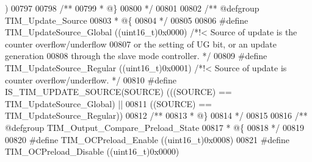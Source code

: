 \begin{DoxyCode}
{      )}
00797 
00798 \textcolor{comment}{/**}
00799 \textcolor{comment}{  * @\}}
00800 \textcolor{comment}{  */}
00801 
00802 \textcolor{comment}{/** @defgroup TIM\_Update\_Source }
00803 \textcolor{comment}{  * @\{}
00804 \textcolor{comment}{  */}
00805 
00806 \textcolor{preprocessor}{#}\textcolor{preprocessor}{define} \textcolor{preprocessor}{TIM\_UpdateSource\_Global}            \textcolor{preprocessor}{(}\textcolor{preprocessor}{(}\textcolor{preprocessor}{uint16\_t}\textcolor{preprocessor}{)}0x0000\textcolor{preprocessor}{)} \textcolor{comment}{/*!< Source of update is the counter
       overflow/underflow}
00807 \textcolor{comment}{                                                                   or the setting of UG bit, or an
       update generation}
00808 \textcolor{comment}{                                                                   through the slave mode controller.
       */}
00809 \textcolor{preprocessor}{#}\textcolor{preprocessor}{define} \textcolor{preprocessor}{TIM\_UpdateSource\_Regular}           \textcolor{preprocessor}{(}\textcolor{preprocessor}{(}\textcolor{preprocessor}{uint16\_t}\textcolor{preprocessor}{)}0x0001\textcolor{preprocessor}{)} \textcolor{comment}{/*!< Source of update is counter
       overflow/underflow. */}
00810 \textcolor{preprocessor}{#}\textcolor{preprocessor}{define} \textcolor{preprocessor}{IS\_TIM\_UPDATE\_SOURCE}\textcolor{preprocessor}{(}\textcolor{preprocessor}{SOURCE}\textcolor{preprocessor}{)} \textcolor{preprocessor}{(}\textcolor{preprocessor}{(}\textcolor{preprocessor}{(}\textcolor{preprocessor}{SOURCE}\textcolor{preprocessor}{)} \textcolor{preprocessor}{==} TIM_UpdateSource_Global\textcolor{preprocessor}{)} \textcolor{preprocessor}{||}
00811                                       \textcolor{preprocessor}{(}\textcolor{preprocessor}{(}\textcolor{preprocessor}{SOURCE}\textcolor{preprocessor}{)} \textcolor{preprocessor}{==} TIM_UpdateSource_Regular\textcolor{preprocessor}{)}\textcolor{preprocessor}{)}
00812 \textcolor{comment}{/**}
00813 \textcolor{comment}{  * @\}}
00814 \textcolor{comment}{  */}
00815 
00816 \textcolor{comment}{/** @defgroup TIM\_Output\_Compare\_Preload\_State }
00817 \textcolor{comment}{  * @\{}
00818 \textcolor{comment}{  */}
00819 
00820 \textcolor{preprocessor}{#}\textcolor{preprocessor}{define} \textcolor{preprocessor}{TIM\_OCPreload\_Enable}               \textcolor{preprocessor}{(}\textcolor{preprocessor}{(}\textcolor{preprocessor}{uint16\_t}\textcolor{preprocessor}{)}0x0008\textcolor{preprocessor}{)}
00821 \textcolor{preprocessor}{#}\textcolor{preprocessor}{define} \textcolor{preprocessor}{TIM\_OCPreload\_Disable}              \textcolor{preprocessor}{(}\textcolor{preprocessor}{(}\textcolor{preprocessor}{uint16\_t}\textcolor{preprocessor}{)}0x0000\textcolor{preprocessor}{)}

\end{DoxyCode}
